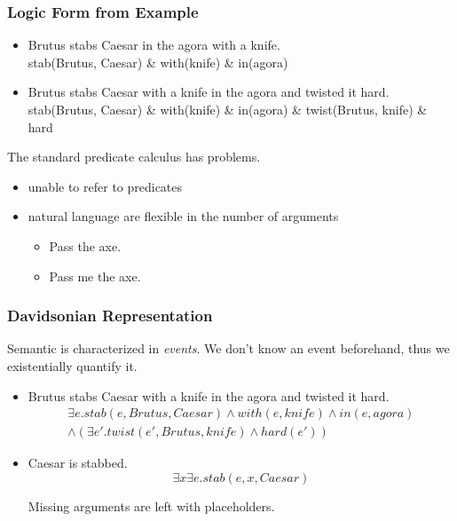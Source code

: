 \documentclass{beamer}
\begin{document}
\begin{frame}
    \frametitle{Logic Form from Example}

    \begin{itemize}
        \item <1-> Brutus stabs Caesar in the agora with a knife. \\
            stab(Brutus, Caesar) \& with(knife) \& in(agora)

        \item <2-> Brutus stabs Caesar with a knife in the agora and twisted it hard. \\
            stab(Brutus, Caesar) \& with(knife) \& in(agora) \& twist(Brutus, knife) \& hard

    \end{itemize}

     {
        The standard predicate calculus has problems.

        \begin{itemize}
            \item unable to refer to predicates
            \item natural language are flexible in the number of arguments
                \begin{itemize}
                    \item Pass the axe.
                    \item Pass \alert{me} the axe.
                \end{itemize}
        \end{itemize}
    }

\end{frame}

\begin{frame}
    \frametitle{Davidsonian Representation}

    Semantic is characterized in \emph{events}.
    We don't know an event beforehand, thus we \alert{existentially quantify} it.

    \begin{itemize}

        \item Brutus stabs Caesar with a knife in the agora and twisted it hard.
            \begin{gather*}
                \exists e . stab(e, Brutus, Caesar) \wedge with(e, knife) \wedge in(e, agora)\\
                \wedge (\exists e' . twist(e', Brutus, knife) \wedge hard(e'))
            \end{gather*}

        \item Caesar is stabbed.
            \[
                \exists x \exists e . stab(e, x, Caesar)
            \]

            Missing arguments are left with \alert{placeholders}.
    \end{itemize}

\end{frame}
\end{document}

